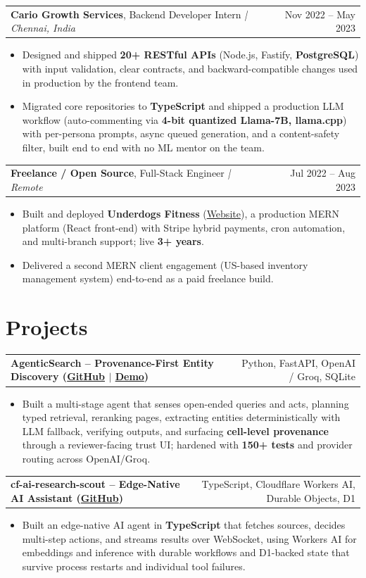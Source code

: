 \documentclass[letterpaper,11pt]{article}
\makeatletter
\newcommand{\expItem}[4]{%
  \vspace{2pt}
  \begin{tabular*}{\textwidth}{@{}l@{\extracolsep{\fill}}r@{}}
    \textbf{#1}, #2 \textit{| #3} & #4 \\
  \end{tabular*}\par\vspace{-2pt}
}
\newcommand{\projItem}[2]{%
  \vspace{4pt}
  \begin{tabular*}{\textwidth}{@{}l@{\extracolsep{\fill}}r@{}}
    \textbf{#1} & #2 \\
  \end{tabular*}\par\vspace{-2pt}
}
\makeatother
\begin{document}
\expItem{Cario Growth Services}{Backend Developer Intern}{Chennai, India}{Nov 2022 -- May 2023}
\begin{itemize}
  \item Designed and shipped \textbf{20+ RESTful APIs} (Node.js, Fastify, \textbf{PostgreSQL}) with input validation, clear contracts, and backward-compatible changes used in production by the frontend team.
  \item Migrated core repositories to \textbf{TypeScript} and shipped a production LLM workflow (auto-commenting via \textbf{4-bit quantized Llama-7B, llama.cpp}) with per-persona prompts, async queued generation, and a content-safety filter, built end to end with no ML mentor on the team.
\end{itemize}

\expItem{Freelance / Open Source}{Full-Stack Engineer}{Remote}{Jul 2022 -- Aug 2023}
\begin{itemize}
  \item Built and deployed \textbf{Underdogs Fitness} (\href{https://www.underdogsfitness.in/}{Website}), a production MERN platform (React front-end) with Stripe hybrid payments, cron automation, and multi-branch support; live \textbf{3+ years}.
  \item Delivered a second MERN client engagement (US-based inventory management system) end-to-end as a paid freelance build.
\end{itemize}

\section{Projects}

\projItem{AgenticSearch -- Provenance-First Entity Discovery {\normalfont\small(\href{https://github.com/Deva-1903/ciir_agentic_search}{GitHub} $\vert$ \href{https://agentic-search-negglszkwa-uc.a.run.app}{Demo})}}{Python, FastAPI, OpenAI / Groq, SQLite}
\begin{itemize}
  \item Built a multi-stage agent that senses open-ended queries and acts, planning typed retrieval, reranking pages, extracting entities deterministically with LLM fallback, verifying outputs, and surfacing \textbf{cell-level provenance} through a reviewer-facing trust UI; hardened with \textbf{150+ tests} and provider routing across OpenAI/Groq.
\end{itemize}

\projItem{cf-ai-research-scout -- Edge-Native AI Assistant {\normalfont\small(\href{https://github.com/Deva-1903/cf_ai_research_scout}{GitHub})}}{TypeScript, Cloudflare Workers AI, Durable Objects, D1}
\begin{itemize}
  \item Built an edge-native AI agent in \textbf{TypeScript} that fetches sources, decides multi-step actions, and streams results over WebSocket, using Workers AI for embeddings and inference with durable workflows and D1-backed state that survive process restarts and individual tool failures.
\end{itemize}
\end{document}

